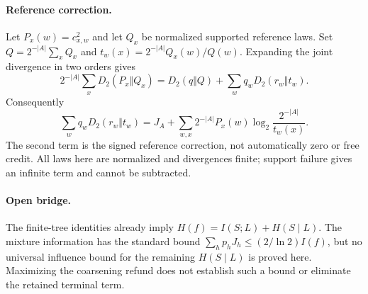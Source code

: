 \documentclass{article}
\begin{document}
\paragraph{Reference correction.}
Let $P_x(w)=c_{x,w}^2$ and let $Q_x$ be normalized supported reference laws.
Set $Q=2^{-|A|}\sum_xQ_x$ and
$t_w(x)=2^{-|A|}Q_x(w)/Q(w)$. Expanding the joint divergence in two orders gives
\[
 2^{-|A|}\sum_xD_2(P_x\Vert Q_x)
 =D_2(q\Vert Q)+\sum_wq_wD_2(r_w\Vert t_w).
\]
Consequently
\[
 \sum_wq_wD_2(r_w\Vert t_w)
 =J_A+\sum_{w,x}2^{-|A|}P_x(w)
       \log_2\frac{2^{-|A|}}{t_w(x)}.
\]
The second term is the signed reference correction, not automatically zero
or free credit. All laws here are normalized and divergences finite; support
failure gives an infinite term and cannot be subtracted.

\paragraph{Open bridge.}
The finite-tree identities already imply
$H(f)=I(S;L)+H(S\mid L)$. The mixture information has the standard bound
$\sum_hp_hJ_h\le (2/\ln2)I(f)$, but no universal influence bound for the
remaining $H(S\mid L)$ is proved here. Maximizing the coarsening refund does
not establish such a bound or eliminate the retained terminal term.
\end{document}
